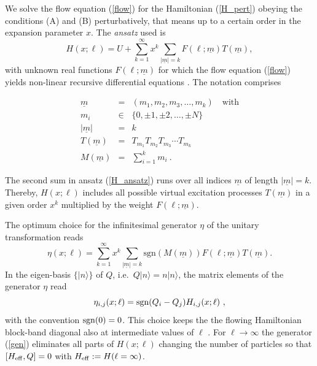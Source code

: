 We solve the flow equation (\ref{flow}) for the Hamiltonian (\ref{H_pert})
obeying the conditions (A) and (B) perturbatively, that means up to a
certain order in the expansion parameter $x$. The  {\it ansatz} used is
  \begin{equation}
    \label{H_ansatz}
    H(x;\ell) = U +\sum_{k=1}^{\infty}x^{k} 
\sum_{|\underline{m}|=k} F(\ell;\underline{m}) 
T(\underline{m}) , 
  \end{equation}
with unknown real functions $F(\ell;\underline{m})$ for which the flow
equation (\ref{flow}) yields non-linear recursive differential
equations \cite{knett00a}. The notation comprises
\begin{mathletters}
\label{sym_def} 
\begin{eqnarray}
  {\underline m}&=&(m_1,m_2,m_3,\ldots,m_k)\quad \mbox{with}\\
  m_i &\in& \{0,\pm 1,\pm 2,\ldots ,\pm N\}\\
  |\underline{m}|&=&k\\
  T({\underline m})&=&T_{m_1}T_{m_2}T_{m_3}\cdots
  T_{m_k}\\
  M({\underline m})&=&\sum_{i=1}^km_i\ .
\end{eqnarray}
\end{mathletters}
The second sum in ansatz (\ref{H_ansatz}) runs over all indices
${\underline m}$ of length $|{\underline m}|=k$. Thereby, $H(x;\ell)$ includes all possible virtual excitation processes $T({\underline m})$ 
in a given order $x^k$  multiplied by the weight $F(\ell;{\underline m})$.   

The optimum choice for the infinitesimal
generator $\eta$ of the unitary transformation reads
\begin{equation}
  \label{eta_bfree}
  \eta(x;\ell)=\sum_{k=1}^{\infty}x^k\sum_{|{\underline m}|=k}
  \mbox{sgn}\left(M({\underline m})\right)F(\ell;{\underline
  m})T({\underline m}) .
\end{equation}
In the eigen-basis $\{|n\rangle\}$ of $Q$,
i.e.\ $Q|n\rangle=n|n\rangle$, the matrix elements of the 
generator $\eta$ read
  \begin{equation}
    \label{gen}
    \eta_{i,j}(x;\ell)={\rm sgn} (Q_i-Q_j)H_{i,j}(x;\ell)\ ,
  \end{equation}
with the convention ${\rm sgn}(0)=0$. This choice keeps the
 the flowing Hamiltonian block-band diagonal
also at intermediate values of $\ell$ \cite{knett00a,mielk98}.
For $\ell \rightarrow \infty$ the generator (\ref{gen}) eliminates all
parts of $H(x;\ell)$ changing the number of particles so that
 $[H_{\rm eff},Q]=0$ with $H_{\rm eff}:=H(\ell=\infty)$.


